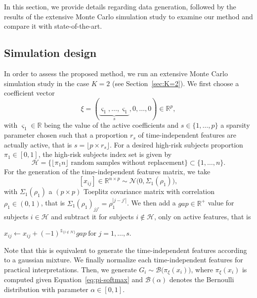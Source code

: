 \documentclass[11pt]{article}
\newcommand{\ind}[1]{\mathds{1}_{#1}}
\newcommand{\cN}{\mathcal N}
\newcommand{\cH}{\mathcal H}
\newcommand{\cB}{\mathcal B}
\newcommand{\R}{\mathds R}
\newcommand{\bSigma}{\textbf{$\Sigma$}}
\begin{document}
In this section, we provide details regarding data generation, followed by the results of the extensive Monte Carlo simulation study to examine our method and compare it with state-of-the-art.

\subsection{Simulation design}
\label{simulation design}

In order to assess the proposed method, we run an extensive Monte Carlo simulation study in the case $K=2$ (see Section~\ref{sec:K=2}). We first choose a coefficient vector 
\begin{equation}
  \label{eq:xi-sparse}
  \xi = (\underbrace{\varsigma_1,\ldots,\varsigma_1}_s,0,\ldots,0) \in \R^p,
\end{equation} 
with $\varsigma_1\in\R$ being the value of the active coefficients and $s\in \{1,\dots,p\}$ a sparsity parameter chosen such that a proportion $r_s$ of time-independent features are actually active, that is $s = \lfloor p \times r_s \rfloor$. 
For a desired high-risk subjects proportion $\pi_1 \in [0,1]$, the high-risk subjects index set is given by
\[\cH = \big\{\lfloor \pi_1 n \rfloor \text{ random samples without replacement} \big\} \subset \{1, \ldots,n\}.\]
For the generation of the time-independent features matrix, we take 
\[ [x_{ij}] \in \R^{n \times p} \sim \cN \big(0, \bSigma_1(\rho_1)\big),\] 
with $\bSigma_1(\rho_1)$ a $(p \times p)$ Toeplitz covariance matrix \citep{mukherjee1988some} with correlation $\rho_1 \in (0, 1)$, that is $\bSigma_1(\rho_1)_{jj'} = \rho_1^{|j - j'|}$. 
We then add a $gap \in \R^+$ value for subjects $i \in \cH$ and subtract it for subjects $i \notin \cH$, only on active features, that is
\begin{center}
$x_{ij} \leftarrow x_{ij} + (-1)^{\ind{\{i \notin \cH\}}} gap\ \text{for } j = 1, \dots, s$.
\end{center}
Note that this is equivalent to generate the time-independent features according to a gaussian mixture. We finally normalize each time-independent features for practical interpretations.
Then, we generate $G_i \sim \cB\big(\pi_\xi(x_i)\big)$, where $\pi_\xi(x_i)$ is computed given Equation~\eqref{eq:pi-softmax} and $\cB(\alpha)$ denotes the Bernoulli distribution with parameter $\alpha \in [0,1]$.
\end{document}
